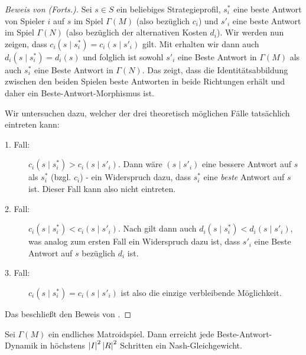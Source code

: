 \begin{proof}[Beweis von  (Forts.)]
	Sei $s \in S$ ein beliebiges Strategieprofil, $s^\ast_i$ eine beste Antwort von Spieler $i$ auf $s$ im Spiel $\Gamma(M)$ (also bezüglich $c_i$) und $s'_i$ eine beste Antwort im Spiel $\Gamma(N)$ (also bezüglich der alternativen Kosten $d_i$). Wir werden nun zeigen, dass $c_i(s \mid s^\ast_i) = c_i(s \mid s'_i)$ gilt. Mit  erhalten wir dann auch $d_i(s \mid s^\ast_i) = d_i(s)$ und folglich ist sowohl $s'_i$ eine Beste Antwort in $\Gamma(M)$ als auch $s^\ast_i$ eine Beste Antwort in $\Gamma(N)$. Das zeigt, dass die Identitätsabbildung zwischen den beiden Spielen beste Antworten in beide Richtungen erhält und daher ein Beste-Antwort-Morphismus ist. 
	
	Wir untersuchen dazu, welcher der drei theoretisch möglichen Fälle tatsächlich eintreten kann:
	\begin{description}
		\item[1. Fall:] $c_i(s \mid s^\ast_i) > c_i(s \mid s'_i)$. Dann wäre $(s \mid s'_i)$ eine bessere Antwort auf $s$ als $s^\ast_i$ (bzgl. $c_i$) - ein Widerspruch dazu, dass $s^\ast_i$ eine \emph{beste} Antwort auf $s$ ist. Dieser Fall kann also nicht eintreten.
		\item[2. Fall:] $c_i(s \mid s^\ast_i) < c_i(s \mid s'_i)$. Nach  gilt dann auch $d_i(s \mid s^\ast_i) < d_i(s \mid s'_i)$, was analog zum ersten Fall ein Widerspruch dazu ist, dass $s'_i$ eine Beste Antwort auf $s$ bezüglich $d_i$ ist.
		\item[3. Fall:] $c_i(s \mid s^\ast_i) = c_i(s \mid s'_i)$ ist also die einzige verbleibende Möglichkeit.
	\end{description}
	Das beschließt den Beweis von .
\end{proof}

\begin{kor}\label{kor:BA-DynamikInMatroidSpielen}
	Sei $\Gamma(M)$ ein endliches Matroidspiel. Dann erreicht jede Beste-Antwort-Dynamik in höchstens $\left|I\right|^2\left|R\right|^2$ Schritten ein Nash-Gleichgewicht.
\end{kor}

